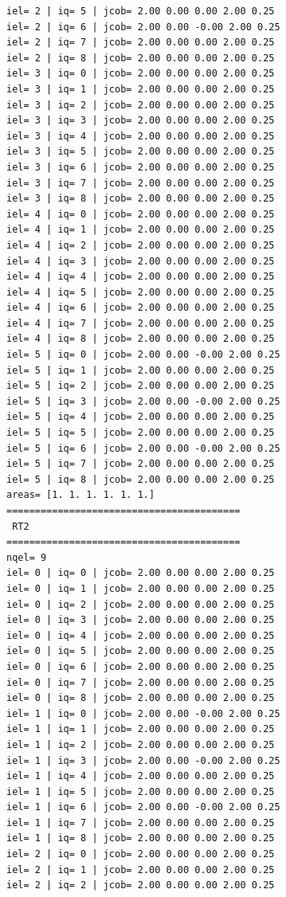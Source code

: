 \begin{tiny}
\begin{verbatim}
iel= 2 | iq= 5 | jcob= 2.00 0.00 0.00 2.00 0.25
iel= 2 | iq= 6 | jcob= 2.00 0.00 -0.00 2.00 0.25
iel= 2 | iq= 7 | jcob= 2.00 0.00 0.00 2.00 0.25
iel= 2 | iq= 8 | jcob= 2.00 0.00 0.00 2.00 0.25
iel= 3 | iq= 0 | jcob= 2.00 0.00 0.00 2.00 0.25
iel= 3 | iq= 1 | jcob= 2.00 0.00 0.00 2.00 0.25
iel= 3 | iq= 2 | jcob= 2.00 0.00 0.00 2.00 0.25
iel= 3 | iq= 3 | jcob= 2.00 0.00 0.00 2.00 0.25
iel= 3 | iq= 4 | jcob= 2.00 0.00 0.00 2.00 0.25
iel= 3 | iq= 5 | jcob= 2.00 0.00 0.00 2.00 0.25
iel= 3 | iq= 6 | jcob= 2.00 0.00 0.00 2.00 0.25
iel= 3 | iq= 7 | jcob= 2.00 0.00 0.00 2.00 0.25
iel= 3 | iq= 8 | jcob= 2.00 0.00 0.00 2.00 0.25
iel= 4 | iq= 0 | jcob= 2.00 0.00 0.00 2.00 0.25
iel= 4 | iq= 1 | jcob= 2.00 0.00 0.00 2.00 0.25
iel= 4 | iq= 2 | jcob= 2.00 0.00 0.00 2.00 0.25
iel= 4 | iq= 3 | jcob= 2.00 0.00 0.00 2.00 0.25
iel= 4 | iq= 4 | jcob= 2.00 0.00 0.00 2.00 0.25
iel= 4 | iq= 5 | jcob= 2.00 0.00 0.00 2.00 0.25
iel= 4 | iq= 6 | jcob= 2.00 0.00 0.00 2.00 0.25
iel= 4 | iq= 7 | jcob= 2.00 0.00 0.00 2.00 0.25
iel= 4 | iq= 8 | jcob= 2.00 0.00 0.00 2.00 0.25
iel= 5 | iq= 0 | jcob= 2.00 0.00 -0.00 2.00 0.25
iel= 5 | iq= 1 | jcob= 2.00 0.00 0.00 2.00 0.25
iel= 5 | iq= 2 | jcob= 2.00 0.00 0.00 2.00 0.25
iel= 5 | iq= 3 | jcob= 2.00 0.00 -0.00 2.00 0.25
iel= 5 | iq= 4 | jcob= 2.00 0.00 0.00 2.00 0.25
iel= 5 | iq= 5 | jcob= 2.00 0.00 0.00 2.00 0.25
iel= 5 | iq= 6 | jcob= 2.00 0.00 -0.00 2.00 0.25
iel= 5 | iq= 7 | jcob= 2.00 0.00 0.00 2.00 0.25
iel= 5 | iq= 8 | jcob= 2.00 0.00 0.00 2.00 0.25
areas= [1. 1. 1. 1. 1. 1.]
=========================================
 RT2
=========================================
nqel= 9
iel= 0 | iq= 0 | jcob= 2.00 0.00 0.00 2.00 0.25
iel= 0 | iq= 1 | jcob= 2.00 0.00 0.00 2.00 0.25
iel= 0 | iq= 2 | jcob= 2.00 0.00 0.00 2.00 0.25
iel= 0 | iq= 3 | jcob= 2.00 0.00 0.00 2.00 0.25
iel= 0 | iq= 4 | jcob= 2.00 0.00 0.00 2.00 0.25
iel= 0 | iq= 5 | jcob= 2.00 0.00 0.00 2.00 0.25
iel= 0 | iq= 6 | jcob= 2.00 0.00 0.00 2.00 0.25
iel= 0 | iq= 7 | jcob= 2.00 0.00 0.00 2.00 0.25
iel= 0 | iq= 8 | jcob= 2.00 0.00 0.00 2.00 0.25
iel= 1 | iq= 0 | jcob= 2.00 0.00 -0.00 2.00 0.25
iel= 1 | iq= 1 | jcob= 2.00 0.00 0.00 2.00 0.25
iel= 1 | iq= 2 | jcob= 2.00 0.00 0.00 2.00 0.25
iel= 1 | iq= 3 | jcob= 2.00 0.00 -0.00 2.00 0.25
iel= 1 | iq= 4 | jcob= 2.00 0.00 0.00 2.00 0.25
iel= 1 | iq= 5 | jcob= 2.00 0.00 0.00 2.00 0.25
iel= 1 | iq= 6 | jcob= 2.00 0.00 -0.00 2.00 0.25
iel= 1 | iq= 7 | jcob= 2.00 0.00 0.00 2.00 0.25
iel= 1 | iq= 8 | jcob= 2.00 0.00 0.00 2.00 0.25
iel= 2 | iq= 0 | jcob= 2.00 0.00 0.00 2.00 0.25
iel= 2 | iq= 1 | jcob= 2.00 0.00 0.00 2.00 0.25
iel= 2 | iq= 2 | jcob= 2.00 0.00 0.00 2.00 0.25

\end{verbatim}
\end{tiny}
